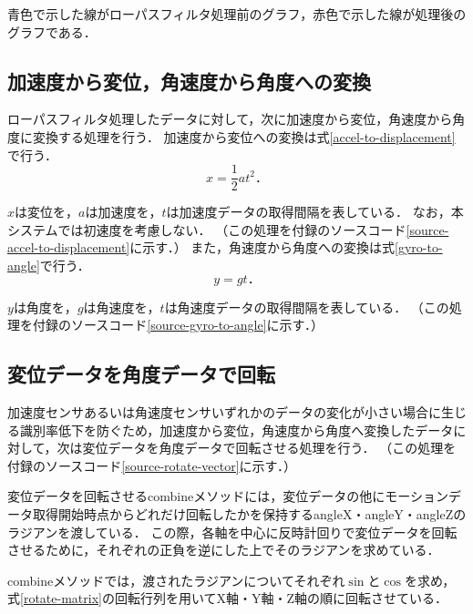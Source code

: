青色で示した線がローパスフィルタ処理前のグラフ，赤色で示した線が処理後のグラフである．

\subsection{加速度から変位，角速度から角度への変換}
ローパスフィルタ処理したデータに対して，次に加速度から変位，角速度から角度に変換する処理を行う．
加速度から変位への変換は式\ref{accel-to-displacement}で行う．
\begin{equation}
\label{accel-to-displacement}
x = \frac{1}{2} a t^2．
\end{equation}

$x$は変位を，$a$は加速度を，$t$は加速度データの取得間隔を表している．
なお，本システムでは初速度を考慮しない．
（この処理を付録のソースコード\ref{source-accel-to-displacement}に示す．）
また，角速度から角度への変換は式\ref{gyro-to-angle}で行う．
\begin{equation}
\label{gyro-to-angle}
y = g t．
\end{equation}

$y$は角度を，$g$は角速度を，$t$は角速度データの取得間隔を表している．
（この処理を付録のソースコード\ref{source-gyro-to-angle}に示す．）

\subsection{変位データを角度データで回転}
加速度センサあるいは角速度センサいずれかのデータの変化が小さい場合に生じる識別率低下を防ぐため，加速度から変位，角速度から角度へ変換したデータに対して，次は変位データを角度データで回転させる処理を行う．
（この処理を付録のソースコード\ref{source-rotate-vector}に示す．）

変位データを回転させるcombineメソッドには，変位データの他にモーションデータ取得開始時点からどれだけ回転したかを保持するangleX・angleY・angleZのラジアンを渡している．
この際，各軸を中心に反時計回りで変位データを回転させるために，それぞれの正負を逆にした上でそのラジアンを求めている．

combineメソッドでは，渡されたラジアンについてそれぞれ$\sin$と$\cos$を求め，式\ref{rotate-matrix}の回転行列を用いてX軸・Y軸・Z軸の順に回転させている．

